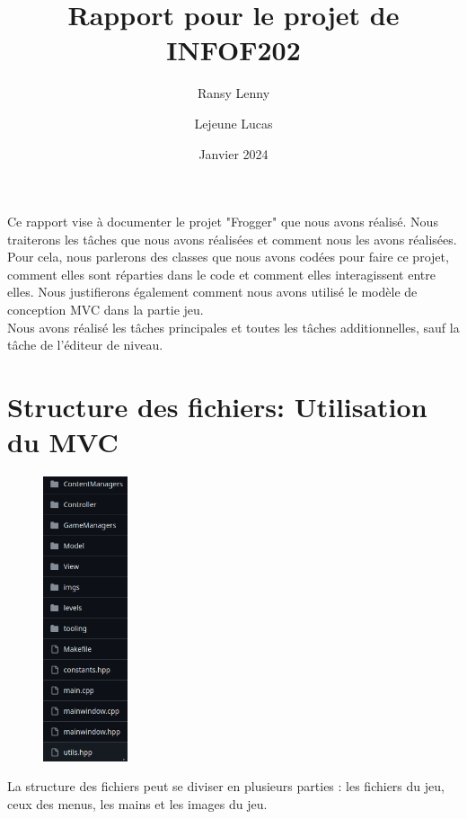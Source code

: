 \documentclass[a4paper, 12pt]{article}
\title{\textbf{Rapport pour le projet de INFOF202}}
\author{
    Ransy Lenny
    \and
    Lejeune Lucas
    }
\date{Janvier 2024}
\begin{document}
\setlength{\parindent}{0em}

\maketitle

Ce rapport vise à documenter le projet "Frogger" que nous avons réalisé. 
Nous traiterons les tâches que nous avons réalisées et comment nous les avons réalisées. 
Pour cela, nous parlerons des classes que nous avons codées pour faire ce projet, 
comment elles sont réparties dans le code et comment elles interagissent entre elles. 
Nous justifierons également comment nous avons utilisé le modèle de conception MVC dans 
la partie jeu. \\

Nous avons réalisé les tâches principales et toutes les tâches additionnelles, 
sauf la tâche de l'éditeur de niveau. 


\section{Structure des fichiers: Utilisation du MVC}
\begin{figure}
    \centering
    \vspace{-0.8cm}
    \includegraphics[width=2.5cm]{Images/folders.png}
\end{figure}

La structure des fichiers peut se diviser en plusieurs parties : les fichiers du jeu, 
ceux des menus, les mains et les images du jeu. \\
\end{document}
